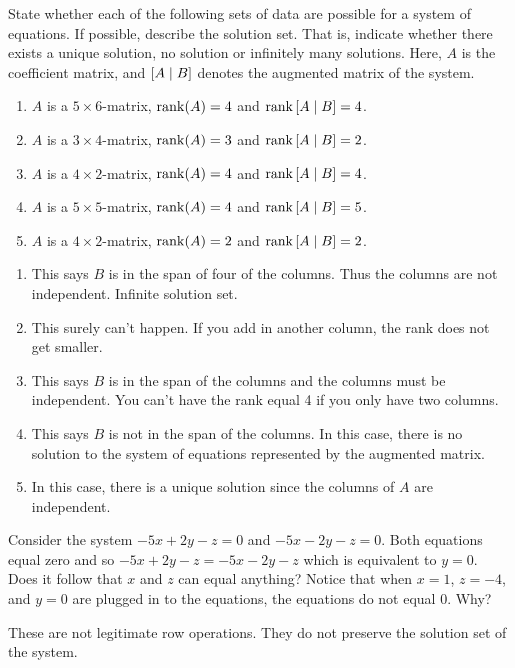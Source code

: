 \begin{ex}
  State whether each of the following sets of data are
  possible for a system of equations. If possible, describe the
  solution set.  That is, indicate whether there exists a unique
  solution, no solution or infinitely many solutions. Here, $A$ is
  the coefficient matrix, and $\left[A\mid B\right]$ denotes the
  augmented matrix of the system.

  \begin{enumerate}
  \item $A$ is a $5\times 6$-matrix, $\rank(A) =4$ and
    $\rank\mat{A\mid B} =4$.

  \item $A$ is a $3\times 4$-matrix, $\rank(A) =3$ and
    $\rank\mat{A\mid B} =2$.

  \item $A$ is a $4\times 2$-matrix, $\rank(A) =4$ and
    $\rank\mat{A\mid B} =4$.

  \item $A$ is a $5\times 5$-matrix, $\rank(A) =4$ and
    $\rank\mat{A\mid B} =5$.

  \item $A$ is a $4\times 2$-matrix, $\rank(A) =2$ and
    $\rank\mat{A\mid B} =2$.
  \end{enumerate}

  \begin{sol}
    \begin{enumerate}
    \item This says $B$ is in the span of four of the columns. Thus the columns are not independent. Infinite solution set.
    \item This surely can't happen. If you add in another column, the rank does not get smaller.
    \item This says $B$ is in the span of the columns and the columns must be
      independent. You can't have the rank equal 4 if you only have two columns.
    \item This says $B$ is not in the span of the columns. In this case, there is no solution to the system of equations represented by the augmented matrix.
    \item In this case, there is a
      unique solution since the columns of $A$ are independent.
    \end{enumerate}
  \end{sol}
\end{ex}

\begin{ex} Consider the system $-5x+2y-z=0$ and $-5x-2y-z=0$. Both equations
equal zero and so $-5x+2y-z=-5x-2y-z$ which is equivalent to $y=0$. Does it follow that $x$
and $z$ can equal anything?  Notice that when $x=1$, $z=-4$, and $y=0$ are plugged in
to the equations, the equations do not equal $0$. Why?
\begin{sol}
These are not legitimate row
operations. They do not preserve the solution set of the system.
\end{sol}
\end{ex}

